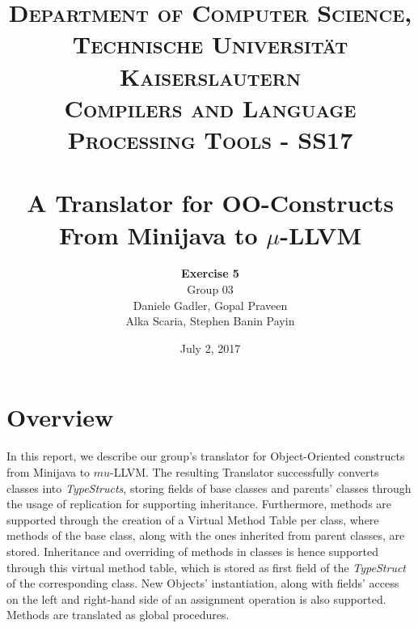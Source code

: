 \documentclass[paper=a4, fontsize=11pt]{scrartcl}
\title{
		\usefont{OT1}{bch}{b}{n}
		\normalfont \normalsize \textsc{Department of Computer Science, Technische Universit\"at Kaiserslautern\\
Compilers and Language Processing Tools - SS17
		} \\ [2pt]
		\horrule{0.5pt} \\[0.4cm]
		\huge A Translator for OO-Constructs\\
		From Minijava to $\mu$-LLVM
		\horrule{2pt} \\[0.5cm]
}
\author{	
		\textbf{Exercise 5}\\
		Group 03\\
        Daniele Gadler, Gopal Praveen\\Alka Scaria, Stephen Banin Payin \\[-1pt]		\normalsize
}
\date{July 2, 2017}
\numberwithin{equation}{section}		%
\numberwithin{figure}{section}			%
\numberwithin{table}{section}				%
\begin{document}
\maketitle

\section*{Overview}
In this report, we describe our group's translator for Object-Oriented constructs from Minijava to $mu$-LLVM. The resulting Translator successfully converts classes into \textit{TypeStructs}, storing fields of base classes and parents' classes through the usage of replication for supporting inheritance. Furthermore, methods are supported through the creation of a Virtual Method Table per class, where methods of the base class, along with the ones inherited from parent classes, are stored. Inheritance and overriding of methods in classes is hence supported through this virtual method table, which is stored as first field of the \textit{TypeStruct} of the corresponding class. New Objects' instantiation, along with fields' access on the left and right-hand side of an assignment operation is also supported. Methods are translated as global procedures. 
\end{document}
